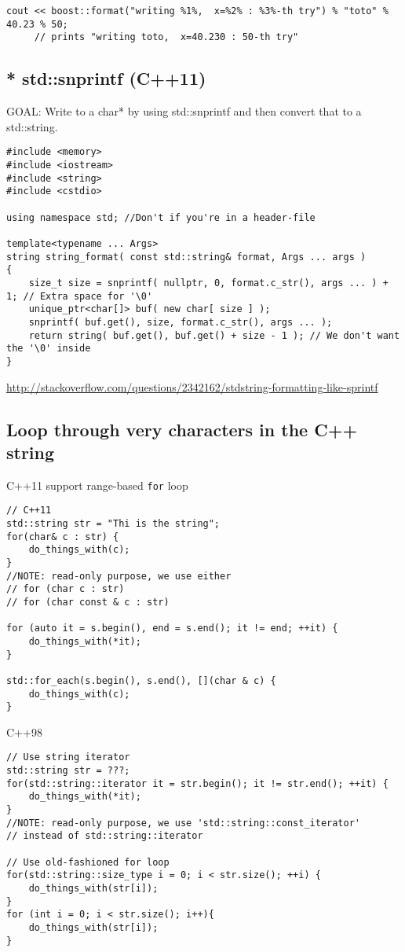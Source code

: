 \begin{verbatim}
cout << boost::format("writing %1%,  x=%2% : %3%-th try") % "toto" % 40.23 % 50; 
     // prints "writing toto,  x=40.230 : 50-th try"
\end{verbatim}

\subsection{* std::snprintf (C++11)}
\label{sec:std::snprintf}

GOAL: Write to a char* by using std::snprintf and then convert that to a
std::string.

\begin{lstlisting}
#include <memory>
#include <iostream>
#include <string>
#include <cstdio>

using namespace std; //Don't if you're in a header-file

template<typename ... Args>
string string_format( const std::string& format, Args ... args )
{
    size_t size = snprintf( nullptr, 0, format.c_str(), args ... ) + 1; // Extra space for '\0'
    unique_ptr<char[]> buf( new char[ size ] ); 
    snprintf( buf.get(), size, format.c_str(), args ... );
    return string( buf.get(), buf.get() + size - 1 ); // We don't want the '\0' inside
}
\end{lstlisting}
\url{http://stackoverflow.com/questions/2342162/stdstring-formatting-like-sprintf}

\subsection{Loop through very characters in the C++ string}

C++11 support range-based \verb!for! loop
\begin{verbatim}
// C++11
std::string str = "Thi is the string";
for(char& c : str) {
    do_things_with(c);
}
//NOTE: read-only purpose, we use either 
// for (char c : str)
// for (char const & c : str)

for (auto it = s.begin(), end = s.end(); it != end; ++it) {
	do_things_with(*it);
}

std::for_each(s.begin(), s.end(), [](char & c) {
	do_things_with(c);
}
\end{verbatim}

C++98
\begin{verbatim}
// Use string iterator
std::string str = ???;
for(std::string::iterator it = str.begin(); it != str.end(); ++it) {
    do_things_with(*it);
}
//NOTE: read-only purpose, we use 'std::string::const_iterator'
// instead of std::string::iterator

// Use old-fashioned for loop
for(std::string::size_type i = 0; i < str.size(); ++i) {
    do_things_with(str[i]);
}
for (int i = 0; i < str.size(); i++){
    do_things_with(str[i]);
}
\end{verbatim}

